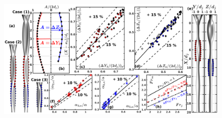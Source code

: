 \documentclass{jfm}
\begin{document}
\clearpage
\begin{figure}
	\centering
	\includegraphics[width=\linewidth]{secondCollision}
	\caption{}
	\label{Figure::secondCollision}
\end{figure}
\cleardoublepage


\end{document}
